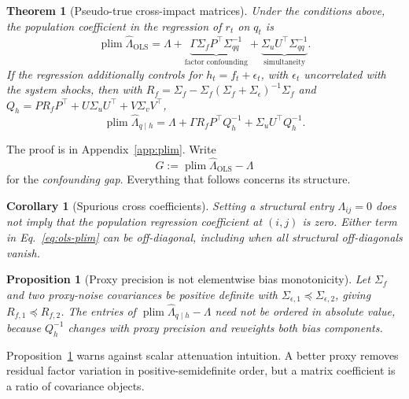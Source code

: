 \documentclass[10pt,twocolumn]{article}
\newtheorem{theorem}{Theorem}
\newtheorem{proposition}{Proposition}
\newtheorem{corollary}{Corollary}
\theoremstyle{remark}
\newcommand{\plim}{\operatorname{plim}}
\begin{document}
\begin{theorem}[Pseudo-true cross-impact matrices]
\label{thm:plim}
Under the conditions above, the population coefficient in the regression of
$r_t$ on $q_t$ is
\begin{equation}
\plim\widehat\Lambda_{\mathrm{OLS}}
=\Lambda
+\underbrace{\Gamma\Sigma_fP^\top\Sigma_{qq}^{-1}}_{\text{factor confounding}}
+\underbrace{\Sigma_uU^\top\Sigma_{qq}^{-1}}_{\text{simultaneity}}.
\label{eq:ols-plim}
\end{equation}
If the regression additionally controls for $h_t=f_t+\epsilon_t$, with
$\epsilon_t$ uncorrelated with the system shocks, then with
$R_f=\Sigma_f-\Sigma_f(\Sigma_f+\Sigma_\epsilon)^{-1}\Sigma_f$ and
$Q_h=PR_fP^\top+U\Sigma_uU^\top+V\Sigma_vV^\top$,
\begin{equation}
\plim\widehat\Lambda_{q\mid h}
=\Lambda
+\Gamma R_fP^\top Q_h^{-1}
+\Sigma_uU^\top Q_h^{-1}. \label{eq:proxy-plim}
\end{equation}
\end{theorem}

The proof is in Appendix~\ref{app:plim}. Write
\begin{equation}
G:=\plim\widehat\Lambda_{\mathrm{OLS}}-\Lambda \label{eq:gap}
\end{equation}
for the \emph{confounding gap}. Everything that follows concerns its structure.

\begin{corollary}[Spurious cross coefficients]
\label{cor:spurious}
Setting a structural entry $\Lambda_{ij}=0$ does not imply that the population
regression coefficient at $(i,j)$ is zero. Either term in
Eq.~\eqref{eq:ols-plim} can be off-diagonal, including when all structural
off-diagonals vanish.
\end{corollary}

\begin{proposition}[Proxy precision is not elementwise bias monotonicity]
\label{prop:proxy}
Let $\Sigma_f$ and two proxy-noise covariances be positive definite with
$\Sigma_{\epsilon,1}\preceq\Sigma_{\epsilon,2}$, giving
$R_{f,1}\preceq R_{f,2}$. The entries of
$\plim\widehat\Lambda_{q\mid h}-\Lambda$ need not be ordered in absolute value,
because $Q_h^{-1}$ changes with proxy precision and reweights both bias
components.
\end{proposition}

Proposition~\ref{prop:proxy} warns against scalar attenuation intuition. A
better proxy removes residual factor variation in positive-semidefinite order,
but a matrix coefficient is a ratio of covariance objects.
\end{document}
